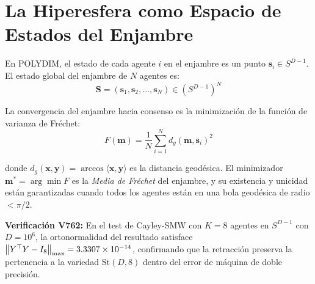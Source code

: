 \section{La Hiperesfera como Espacio de Estados del Enjambre}

En POLYDIM, el estado de cada agente $i$ en el enjambre es un punto
$\mathbf{s}_i \in S^{D-1}$. El estado global del enjambre de $N$ agentes es:
\begin{equation}
\mathbf{S} = (\mathbf{s}_1, \mathbf{s}_2, \ldots, \mathbf{s}_N) \in (S^{D-1})^N
\end{equation}

La convergencia del enjambre hacia consenso es la minimización de la función
de varianza de Fréchet:
\begin{equation}
F(\mathbf{m}) = \frac{1}{N} \sum_{i=1}^{N} d_g(\mathbf{m}, \mathbf{s}_i)^2
\end{equation}

donde $d_g(\mathbf{x}, \mathbf{y}) = \arccos\langle \mathbf{x}, \mathbf{y} \rangle$
es la distancia geodésica. El minimizador $\mathbf{m}^* = \arg\min F$ es la
\textit{Media de Fréchet} del enjambre, y su existencia y unicidad están garantizadas
cuando todos los agentes están en una bola geodésica de radio $< \pi/2$.

\begin{certifiedbox}
\textbf{Verificación V762:} En el test de Cayley-SMW con $K = 8$ agentes en
$S^{D-1}$ con $D = 10^6$, la ortonormalidad del resultado satisface
$\norm{Y^\top Y - I_8}_{\max} = 3.3307 \times 10^{-14}$, confirmando que
la retracción preserva la pertenencia a la variedad $\text{St}(D, 8)$
dentro del error de máquina de doble precisión.
\end{certifiedbox}

